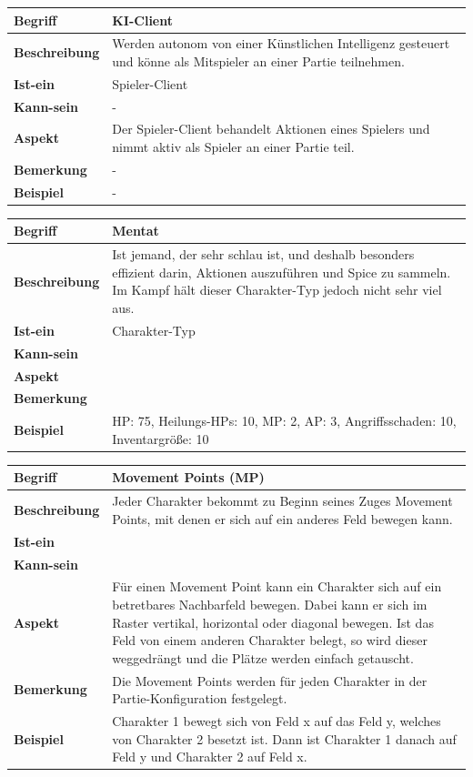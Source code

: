 \documentclass[12pt]{article}
\newcounter{fa}
\newcounter{nfa}
\begin{document}
\begin{tabularx}{\linewidth}{|l|X|}
\hline
\textbf{Begriff} & \textbf{KI-Client} \\
\hline
\textbf{Beschreibung} & Werden autonom von einer Künstlichen Intelligenz gesteuert und könne als Mitspieler an einer Partie teilnehmen. \\
\hline
\textbf{Ist-ein} & Spieler-Client \\
\hline
\textbf{Kann-sein} & - \\
\hline
\textbf{Aspekt} & Der Spieler-Client behandelt Aktionen eines Spielers und nimmt aktiv als Spieler an einer Partie teil. \\
\hline
\textbf{Bemerkung} & - \\
\hline
\textbf{Beispiel} & - \\
\hline
\end{tabularx}

\begin{tabularx}{\linewidth}{|l|X|}
\hline
\textbf{Begriff} & \textbf{Mentat} \\
\hline
\textbf{Beschreibung} & Ist jemand, der sehr schlau ist, und deshalb besonders effizient darin, Aktionen auszuführen und Spice zu sammeln. Im Kampf hält dieser Charakter-Typ jedoch nicht sehr viel aus. \\
\hline
\textbf{Ist-ein} & Charakter-Typ\\
\hline
\textbf{Kann-sein} & \\
\hline
\textbf{Aspekt} & \\
\hline
\textbf{Bemerkung} &  \\
\hline
\textbf{Beispiel} & HP: 75, Heilungs-HPs: 10, MP: 2, AP: 3, Angriffsschaden: 10, Inventargröße: 10 \\
\hline
\end{tabularx}

\begin{tabularx}{\linewidth}{|l|X|}
\hline
\textbf{Begriff} & \textbf{Movement Points (MP)} \\
\hline
\textbf{Beschreibung} & Jeder Charakter bekommt zu Beginn seines Zuges Movement Points, mit denen er sich auf ein anderes Feld bewegen kann. \\
\hline
\textbf{Ist-ein} & \\
\hline
\textbf{Kann-sein} & \\
\hline
\textbf{Aspekt} & Für einen Movement Point kann ein Charakter sich auf ein betretbares Nachbarfeld bewegen. Dabei kann er sich im Raster vertikal, horizontal oder diagonal bewegen. Ist das Feld von einem anderen Charakter belegt, so wird dieser weggedrängt und die Plätze werden einfach getauscht.\\
\hline
\textbf{Bemerkung} & Die Movement Points werden für jeden Charakter in der Partie-Konfiguration festgelegt. \\
\hline
\textbf{Beispiel} & Charakter 1 bewegt sich von Feld x auf das Feld y, welches von Charakter 2 besetzt ist. Dann ist Charakter 1 danach auf Feld y und Charakter 2 auf Feld x. \\
\hline
\end{tabularx}
\end{document}
